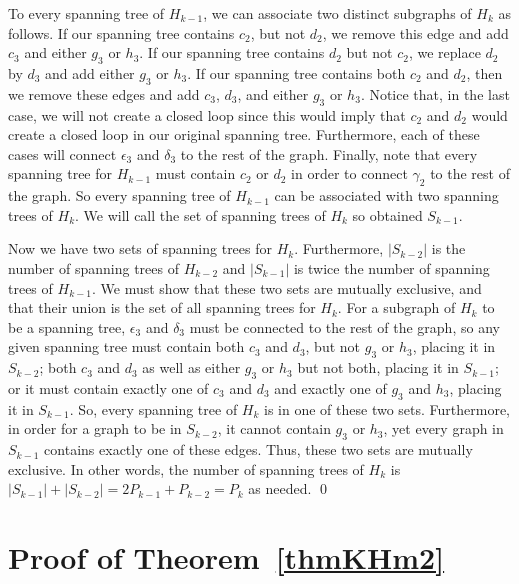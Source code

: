 \documentclass{amsart}
\begin{document}
To every spanning tree of $H_{k-1}$, we can associate two distinct subgraphs of $H_{k}$ as follows.  If our spanning tree contains $c_{2}$, but not $d_{2}$, we remove this edge and add $c_{3}$ and either $g_{3}$ or $h_{3}$.  If our spanning tree contains $d_{2}$ but not $c_{2}$, we replace $d_{2}$ by $d_3$ and add either $g_{3}$ or $h_{3}$.  If our spanning tree contains both $c_{2}$ and $d_{2}$, then we remove these edges and add $c_{3}$, $d_{3}$, and either $g_{3}$ or $h_{3}$.  Notice that, in the last case, we will not create a closed loop since this would imply that $c_{2}$ and $d_{2}$ would create a closed loop in our original spanning tree. Furthermore, each of these cases will connect $\epsilon_{3}$ and $\delta_{3}$ to the rest of the graph.  Finally, note that every spanning tree for $H_{k-1}$ must contain $c_{2}$ or $d_{2}$ in order to connect $\gamma_2$ to the rest of the graph.  So every spanning tree of $H_{k-1}$ can be associated with two spanning trees of $H_{k}$.  We will call the set of spanning trees of $H_{k}$ so obtained $S_{k-1}$.

Now we have two sets of spanning trees for $H_{k}$.  Furthermore, $|S_{k-2}|$ is the number of spanning trees of $H_{k-2}$ and $|S_{k-1}|$ is twice the number of spanning trees of $H_{k-1}$. We must show that these two sets are mutually exclusive, and that their union is the set of all spanning trees for $H_{k}$. For a subgraph of $H_{k}$ to be a spanning tree, $\epsilon_{3}$ and $\delta_{3}$ must be connected to the rest of the graph, so any given spanning tree must contain both $c_{3}$ and $d_{3}$, but not $g_{3}$ or $h_{3}$, placing it in $S_{k-2}$; both $c_{3}$ and $d_{3}$ as well as either $g_{3}$ or $h_{3}$ but not both, placing it in $S_{k-1}$; or it must contain exactly one of $c_{3}$ and $d_{3}$ and exactly one of $g_{3}$ and $h_{3}$, placing it in $S_{k-1}$. So, every spanning tree of $H_{k}$ is in one of these two sets.  Furthermore, in order for a graph to be in $S_{k-2}$, it cannot contain $g_{3}$ or $h_{3}$, yet every graph in $S_{k-1}$ contains exactly one of these edges.  Thus, these two sets are mutually exclusive.  In other words, the number of spanning trees of $H_{k}$ is $|S_{k-1}|+|S_{k-2}|=2P_{k-1}+P_{k-2}=P_{k}$ as needed. {\qed}

\section{Proof of Theorem~\ref{thmKHm2}}

\setcounter{thm}{2}
\end{document}
